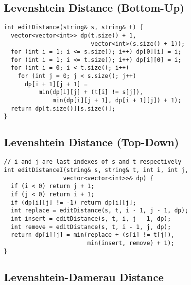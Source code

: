 \documentclass[twoside]{article}
\begin{document}
\begin{multicols*}{2}
\subsectionfont{\large\bfseries\sffamily\underline}
\subsection*{Levenshtein Distance (Bottom-Up)}
\begin{verbatim}
int editDistance(string& s, string& t) {
  vector<vector<int>> dp(t.size() + 1,
                         vector<int>(s.size() + 1));
  for (int i = 1; i <= s.size(); i++) dp[0][i] = i;
  for (int i = 1; i <= t.size(); i++) dp[i][0] = i;
  for (int i = 0; i < t.size(); i++)
    for (int j = 0; j < s.size(); j++)
      dp[i + 1][j + 1] =
          min(dp[i][j] + (t[i] != s[j]),
              min(dp[i][j + 1], dp[i + 1][j]) + 1);
  return dp[t.size()][s.size()];
}
\end{verbatim}

\subsectionfont{\large\bfseries\sffamily\underline}
\subsection*{Levenshtein Distance (Top-Down)}
\begin{verbatim}
// i and j are last indexes of s and t respectively
int editDistanceI(string& s, string& t, int i, int j,
                 vector<vector<int>>& dp) {
  if (i < 0) return j + 1;
  if (j < 0) return i + 1;
  if (dp[i][j] != -1) return dp[i][j];
  int replace = editDistance(s, t, i - 1, j - 1, dp);
  int insert = editDistance(s, t, i, j - 1, dp);
  int remove = editDistance(s, t, i - 1, j, dp);
  return dp[i][j] = min(replace + (s[i] != t[j]),
                        min(insert, remove) + 1);
}
\end{verbatim}

\subsectionfont{\large\bfseries\sffamily\underline}
\subsection*{Levenshtein-Damerau Distance}
\begin{verbatim}

\end{verbatim}

\subsectionfont{\large\bfseries\sffamily\underline}

\end{multicols*}
\end{document}
